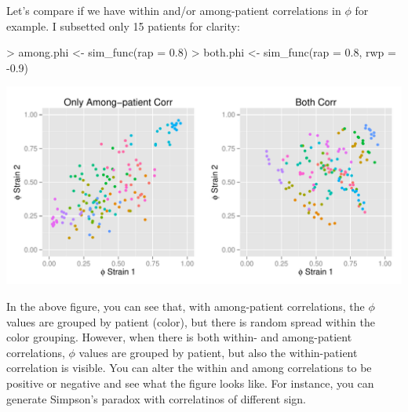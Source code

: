 \documentclass{article}
\begin{document}
Let's compare if we have within and/or among-patient correlations in $\phi$ for example. I subsetted only 15 patients for clarity:

\begin{Schunk}
\begin{Sinput}
> among.phi <- sim_func(rap = 0.8)
> both.phi <- sim_func(rap = 0.8, rwp = -0.9)
\end{Sinput}
\end{Schunk}

\begin{center}
\includegraphics{ReadMe-008}
\end{center}

In the above figure, you can see that, with among-patient correlations, the $\phi$ values are grouped by patient (color), but there is random spread within the color grouping. However, when there is both within- and among-patient correlations, $\phi$ values are grouped by patient, but also the within-patient correlation is visible. You can alter the within and among correlations to be positive or negative and see what the figure looks like. For instance, you can generate Simpson's paradox with correlatinos of different sign. 
\end{document}
